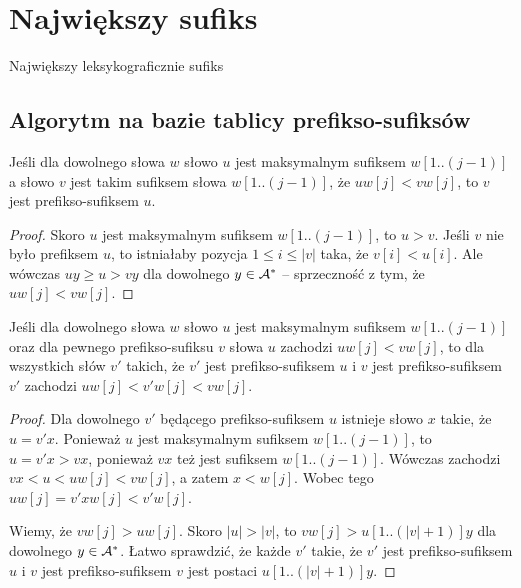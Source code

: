 \section{Największy sufiks}

\begin{algorithm}[H]
    \caption{Największy leksykograficznie sufiks}
\end{algorithm}

\subsection{Algorytm na bazie tablicy prefikso-sufiksów}

\begin{lemma}{}{}
  Jeśli dla dowolnego słowa $w$ słowo $u$ jest maksymalnym sufiksem $w[1..(j - 1)]$ a słowo $v$ jest takim sufiksem słowa $w[1..(j - 1)]$, że $u w[j] < v w[j]$, to $v$ jest prefikso-sufiksem $u$.
\end{lemma}

\begin{proof}
  Skoro $u$ jest maksymalnym sufiksem $w[1..(j - 1)]$, to $u > v$. Jeśli $v$ nie było prefiksem $u$, to istniałaby pozycja $1 \le i \le |v|$ taka, że $v[i] < u[i]$. Ale wówczas $uy \ge u > vy$ dla dowolnego $y \in \mathcal{A}^*$ -- sprzeczność z tym, że $u w[j] < v w[j]$.
\end{proof}

\begin{lemma}{}{}
  Jeśli dla dowolnego słowa $w$ słowo $u$ jest maksymalnym sufiksem $w[1..(j - 1)]$ oraz dla pewnego prefikso-sufiksu $v$ słowa $u$ zachodzi $u w[j] < v w[j]$, to dla wszystkich słów $v'$ takich, że $v'$ jest prefikso-sufiksem $u$ i $v$ jest prefikso-sufiksem $v'$ zachodzi $u w[j] < v' w[j] < v w[j]$.
\end{lemma}

\begin{proof}
  Dla dowolnego $v'$ będącego prefikso-sufiksem $u$ istnieje słowo $x$ takie, że $u = v' x$.
  Ponieważ $u$ jest maksymalnym sufiksem $w[1..(j - 1)]$, to $u = v' x > v x$, ponieważ $v x$ też jest sufiksem $w[1..(j - 1)]$.
  Wówczas zachodzi $v x < u < u w[j] < v w[j]$, a zatem $x < w[j]$.
  Wobec tego $u w[j] = v' x w[j] < v' w[j]$.
  
  Wiemy, że $v w[j] > u w[j]$. Skoro $|u| > |v|$, to $v w[j] > u[1..(|v| + 1)] y$ dla dowolnego $y \in \mathcal{A}^*$.
  Łatwo sprawdzić, że każde $v'$ takie, że $v'$ jest prefikso-sufiksem $u$ i $v$ jest prefikso-sufiksem $v$ jest postaci $u[1..(|v| + 1)] y$.
\end{proof}


